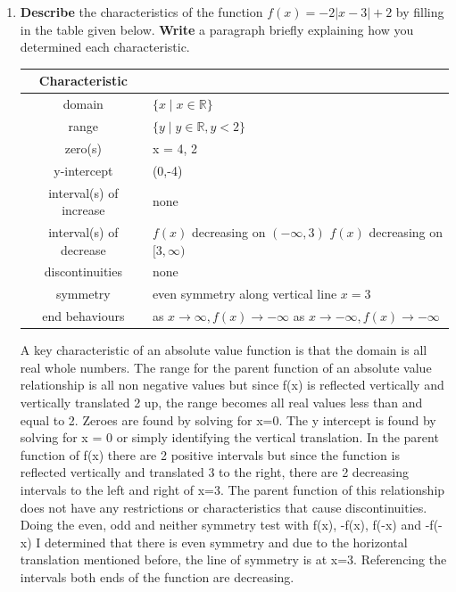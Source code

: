 \documentclass[12pt]{book}
\begin{document}

\begin{enumerate}

\item  \textbf{Describe} the characteristics of the function $f(x) = -2|x-3|+2$ by filling in the table given below. \textbf{Write} a paragraph briefly explaining how you determined each characteristic.\\

\vspace{0.3 cm}

\renewcommand{\arraystretch}{3}  %
\begin{center}

\begin{tabular}{|c|m{4in}|}
\hline
\textbf{Characteristic} &  \\
\hline
domain & $\{ x \mid x \in \mathbb{R} \}$\\
\hline
range & $\{ y \mid y \in \mathbb{R}, y < 2 \}$\\
\hline
zero(s) & x = 4, 2\\
\hline
y-intercept & (0,-4)\\
\hline
interval(s) of increase & none\\
\hline
interval(s) of decrease & \shortstack[l]{$f(x)$ decreasing on $(-\infty, 3)$ \\$f(x)$ decreasing on $[3, \infty)$}\\
\hline
discontinuities & none\\
\hline
symmetry & even symmetry along vertical line $x=3$\\
\hline
end behaviours & \shortstack[l]{as $x \to \infty, f(x) \to -\infty$ \\ as $x \to -\infty, f(x) \to -\infty$}\\
\hline
\end{tabular}
\end{center}

A key characteristic of an absolute value function is that the domain is all
 real whole numbers. The range for the parent function of an absolute
value relationship is all non negative values but since f(x)
is reflected vertically and vertically translated 2 up, the range becomes all
real values less than and equal to 2. Zeroes are found by solving for x=0.
The y intercept is found by solving for x = 0 or simply identifying the vertical translation.
In the parent function of f(x) there are 2 positive intervals but since the function
is reflected vertically and translated 3 to the right, there are 2 decreasing intervals to the
left and right of x=3. The parent function of this relationship does not have any restrictions or characteristics
that cause discontinuities. Doing the even, odd and neither symmetry test with f(x), -f(x), f(-x) and -f(-x)
I determined that there is even symmetry and due to the horizontal translation mentioned before, the line
of symmetry is at x=3. Referencing the intervals both ends of the function are decreasing.


\end{enumerate}
\end{document}
